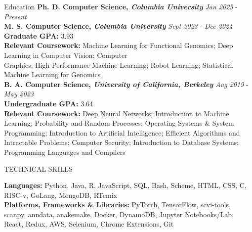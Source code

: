 \documentclass{resume} %
\begin{document}

\begin{rSection}{Education}
{\bf Ph. D. Computer Science, \textit{Columbia University}} \hfill {\textit{Jan 2025} - \textit{Present}}\\
{\bf M. S. Computer Science, \textit{Columbia University}} \hfill {\textit{Sept 2023} - \textit{Dec 2024}}\\
\hspace*{6mm} \textbf{Graduate GPA:} 3.93\\
\hspace*{6mm} \textbf{Relevant Coursework:} Machine Learning for Functional Genomics; Deep Learning in Computer Vision; Computer \\
\hspace*{6mm} Graphics; High Performance Machine Learning; Robot Learning; Statistical Machine Learning for Genomics \\
{\bf B. A. Computer Science, \textit{University of California, Berkeley}} \hfill {\textit{Aug 2019} - \textit{May 2023}}\\
\hspace*{6mm} \textbf{Undergraduate GPA:} 3.64\\
\hspace*{6mm} \textbf{Relevant Coursework:} Deep Neural Networks; Introduction to Machine Learning; Probability and Random Processes;  \hspace*{6mm} Operating Systems \& System Programming; Introduction to Artificial Intelligence; Efficient Algorithms and Intractable \hspace*{6mm} Problems; Computer Security; Introduction to Database Systems; Programming Languages and Compilers


\end{rSection}

\begin{rSection}{TECHNICAL SKILLS}

{\bf Languages:} Python, Java, R, JavaScript, SQL, Bash, Scheme, HTML, CSS, C, RISC-v, GoLang, MongoDB, RTcmix
\\
{\bf Platforms, Frameworks \& Libraries:} PyTorch, TensorFlow, scvi-tools, scanpy, anndata, anakemake, Docker, DynamoDB, Jupyter Notebooks/Lab, React, Redux, AWS, Selenium, Chrome Extensions, Git
\end{rSection}
\end{document}
